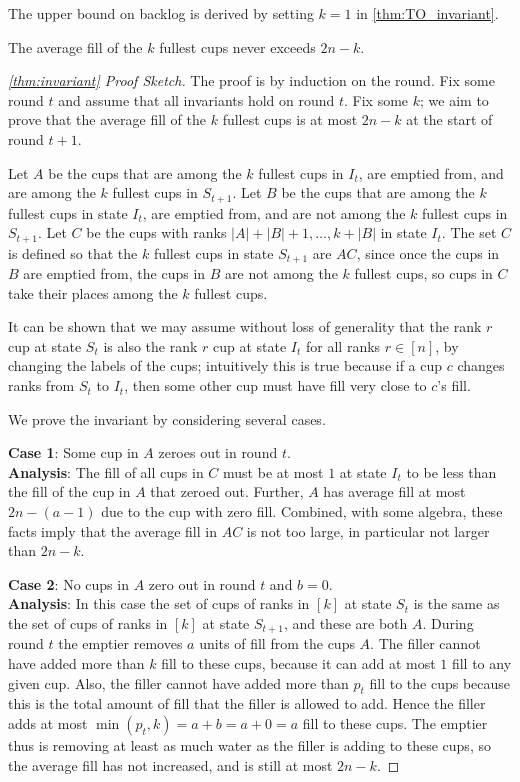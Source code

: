 The upper bound on backlog is derived by setting $k=1$ in
\cref{thm:TO_invariant}.
\begin{theorem}
  \label{thm:TO_invariant}
  The average fill of the $k$ fullest cups never exceeds $2n-k$.
\end{theorem}
\begin{proof}[\cref{thm:invariant} Proof Sketch]
 The proof is by induction on the round. Fix some
round $t$ and assume that all invariants hold on round $t$. Fix
some $k$; we aim to prove that the average fill of the $k$
fullest cups is at most $2n-k$ at the start of round $t+1$. 

Let $A$ be the cups that are among the $k$ fullest cups in $I_t$,
are emptied from, and are among the $k$ fullest cups in
$S_{t+1}$. Let $B$ be the cups that are among the $k$ fullest
cups in state $I_t$, are emptied from, and are not among the $k$
fullest cups in $S_{t+1}$. Let $C$ be the cups with ranks $|A| +
|B| + 1, \ldots, k + |B|$ in state $I_t$. The set $C$ is defined
so that the $k$ fullest cups in state $S_{t+1}$ are $AC$, since
once the cups in $B$ are emptied from, the cups in $B$ are not
among the $k$ fullest cups, so cups in $C$ take their places
among the $k$ fullest cups.

It can be shown that we may assume without loss of generality
that the rank $r$ cup at state $S_t$ is also the rank $r$ cup at
state $I_t$ for all ranks $r \in [n]$, by changing the labels of
the cups; intuitively this is true because if a cup $c$ changes
ranks from $S_t$ to $I_t$, then some other cup must have fill
very close to $c$'s fill.

We prove the invariant by considering several cases.

\noindent\textbf{Case 1}:
Some cup in $A$ zeroes out in round $t$.\\
\textbf{Analysis}:
The fill of all cups in $C$ must be at most $1$ at state $I_t$ to be
less than the fill of the cup in $A$ that zeroed out. Further,
$A$ has average fill at most $2n-(a-1)$ due to the cup with zero
fill. Combined, with some algebra, these facts imply that the
average fill in $AC$ is not too large, in particular not larger
than $2n-k$.

\noindent\textbf{Case 2}:
No cups in $A$ zero out in round $t$ and $b=0$.\\
\textbf{Analysis}:
In this case the set of cups of ranks in $[k]$ at state $S_t$ is
the same as the set of cups of ranks in $[k]$ at state $S_{t+1}$,
and these are both $A$. During round $t$ the emptier removes $a$
units of fill from the cups $A$. The filler cannot have added
more than $k$ fill to these cups, because it can add at most $1$
fill to any given cup. Also, the filler cannot have added more
than $p_t$ fill to the cups because this is the total amount of
fill that the filler is allowed to add. Hence the filler adds at
most $\min(p_t, k) = a+b=a+0=a$ fill to these cups. The emptier
thus is removing at least as much water as the filler is adding
to these cups, so the average fill has not increased, and is
still at most $2n-k$.


\end{proof}
